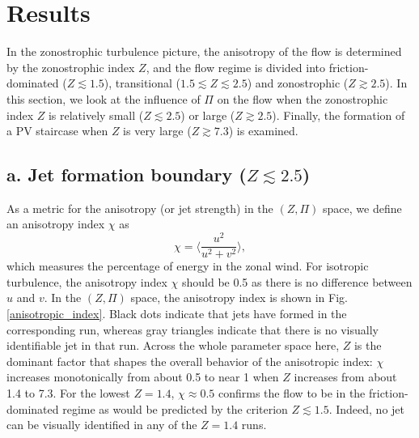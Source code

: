 \documentclass{jfm}
\begin{document}
\section{Results}

In the zonostrophic turbulence picture, the anisotropy of the flow is
determined by the zonostrophic index $Z$, and the flow regime is
divided into friction-dominated ($Z\apprle1.5$), transitional ($1.5\apprle Z\apprle2.5$)
and zonostrophic ($Z\apprge2.5$). In this section, we look at the
influence of $\Pi$ on the flow when the zonostrophic index $Z$ is
relatively small ($Z\apprle2.5$) or large ($Z\apprge2.5$). Finally,
the formation of a PV staircase when $Z$ is very large ($Z\apprge7.3$)
is examined.

\subsection*{a. Jet formation boundary ($Z\apprle2.5$)}

As a metric for the anisotropy (or jet strength)
in the $(Z,\Pi)$ space, we define an anisotropy index $\chi$ as
\begin{equation}
\chi=\langle\frac{u^{2}}{u^{2}+v^{2}}\rangle,
\end{equation}
which measures the percentage of energy in the zonal wind. For
isotropic turbulence, the anisotropy index $\chi$ should be 0.5
as there is no difference between $u$ and $v$. In the $(Z,\Pi)$
space, the anisotropy index is shown in Fig. \ref{anisotropic_index}.
Black dots indicate that jets have formed in the corresponding run,
whereas gray triangles indicate that there is no visually identifiable
jet in that run. Across the whole parameter space here, $Z$ is the
dominant factor that shapes the overall behavior of the anisotropic
index: $\chi$ increases monotonically from about 0.5 to near 1 when
$Z$ increases from about 1.4 to 7.3. For the lowest $Z=1.4$, $\chi\approx0.5$
confirms the flow to be in the friction-dominated regime as would
be predicted by the criterion $Z\apprle1.5$. Indeed, no jet can be visually identified in any 
of the $Z=1.4$ runs. %
\end{document}
